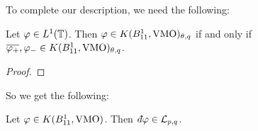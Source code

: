 To complete our description, we need the following:
\begin{lemma}
    Let $\varphi \in L^1(\mathbb{T})$. Then $\varphi \in K(B_{11}^1,\operatorname{VMO})_{\theta,q}$ if and only
    if $\overline{\varphi_+},\varphi_- \in K(B_{11}^1,\operatorname{VMO})_{\theta,q}$.
\end{lemma}
\begin{proof}
    
\end{proof}
    
So we get the following:
\begin{corollary}
    Let $\varphi\in K(B_{11}^1,\operatorname{VMO})$. Then $\qd \varphi \in \mathcal{L}_{p,q}$. 
\end{corollary}
